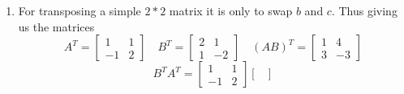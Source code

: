 \documentclass[a4paper, 12pt]{article}
\begin{document}
{\begin{enumerate}
\[\begin{bmatrix}
		3 & 3 \\
		4 & -1
		\end{bmatrix} = \begin{bmatrix}
		\frac{1}{5} & \frac{1}{5} \\
		\frac{4}{15} & -\frac{1}{15}
		\end{bmatrix}
	\]
	\[
		B^{-1}A^{-1} = \begin{bmatrix}
		\frac{2}{5} & \frac{1}{5} \\
		\frac{1}{5} & -\frac{2}{5}
		\end{bmatrix}\begin{bmatrix}
		\frac{2}{3} & \frac{1}{3} \\
		- \frac{1}{3} & \frac{1}{3}
		\end{bmatrix} = \begin{bmatrix}
		(\frac{2}{5} * \frac{2}{3}) + (\frac{1}{5} * -\frac{1}{3}) & (\frac{2}{5} * \frac{1}{3}) + (\frac{1}{5} * \frac{1}{3}) \\
		(\frac{1}{5} * \frac{2}{3}) + (-\frac{2}{5} * -\frac{1}{3}) & (\frac{1}{5} * \frac{1}{3}) + (-\frac{2}{5} * \frac{1}{3})
		\end{bmatrix} = \begin{bmatrix}
		\frac{1}{5} & \frac{1}{5} \\
		\frac{4}{15} & -\frac{1}{15}
		\end{bmatrix}
	\]
	\[
		(AB)^{-1} = B^{-1}A^{-1} = \begin{bmatrix}
		\frac{1}{5} & \frac{1}{5} \\
		\frac{4}{15} & -\frac{1}{15}
		\end{bmatrix}
	\]
	\item
	For transposing a simple $2 * 2$ matrix it is only to swap $b$ and $c$. Thus giving us the matrices
	\[
		A^T = \begin{bmatrix}
		1 & 1 \\
		-1 & 2
		\end{bmatrix} \quad B^T = \begin{bmatrix}
		2 & 1 \\
		1 & -2
		\end{bmatrix} \quad (AB)^T = \begin{bmatrix}
		1 & 4 \\
		3 & -3
		\end{bmatrix}
	\]
	\[
		B^TA^T = \begin{bmatrix}
		1 & 1 \\
		-1 & 2
		\end{bmatrix} \begin{bmatrix}

\end{bmatrix}\]
\end{enumerate}}
\end{document}
